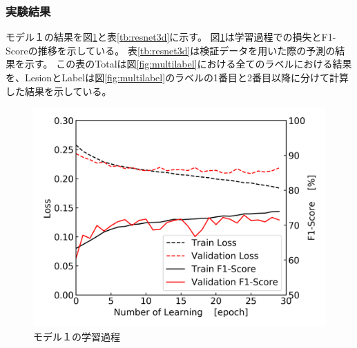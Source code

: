 \subsubsection{実験結果}
モデル１の結果を図\ref{fig:resnet3d_result_process}と表\ref{tb:resnet3d}に示す。
図\ref{fig:resnet3d_result_process}は学習過程での損失とF1-Scoreの推移を示している。
表\ref{tb:resnet3d}は検証データを用いた際の予測の結果を示す。
この表のTotalは図\ref{fig:multilabel}における全てのラベルにおける結果を、LesionとLabelは図\ref{fig:multilabel}のラベルの1番目と2番目以降に分けて計算した結果を示している。

\begin{figure}[htbp]
    \begin{center}
        \includegraphics[width=150mm]{./fig/resnet3dprocess.png}
        \caption{モデル１の学習過程}
        \label{fig:resnet3d_result_process}
    \end{center}
\end{figure}

